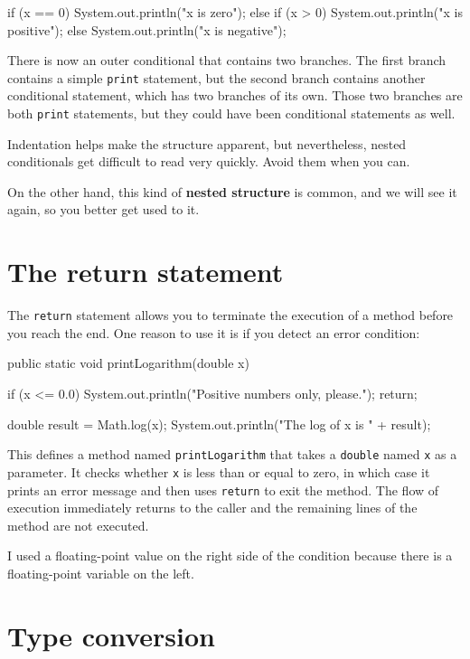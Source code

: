 \begin{code}
    if (x == 0) {
      System.out.println("x is zero");
    } else {
      if (x > 0) {
        System.out.println("x is positive");
      } else {
        System.out.println("x is negative");
      }
    }
\end{code}
%
There is now an outer conditional that contains two branches.  The
first branch contains a simple {\tt print} statement, but the second
branch contains another conditional statement, which has two branches
of its own.  Those two branches are both {\tt print}
statements, but they could have been conditional statements as
well.

Indentation helps make the structure
apparent, but nevertheless, nested conditionals get difficult to read
very quickly.  Avoid them when you can.

On the other hand, this kind of {\bf nested structure} is common, and
we will see it again, so you better get used to it.


\section{The return statement}

The {\tt return} statement allows you to terminate the execution
of a method before you reach the end.  One reason to use it
is if you detect an error condition:

\begin{code}
  public static void printLogarithm(double x) {
    if (x <= 0.0) {
      System.out.println("Positive numbers only, please.");
      return;
    }

    double result = Math.log(x);
    System.out.println("The log of x is " + result);
  }
\end{code}
%
This defines a method named {\tt printLogarithm} that takes a
{\tt  double} named {\tt x} as a parameter.  It checks whether
{\tt  x} is less than or equal to zero, in which case it prints an error
message and then uses {\tt return} to exit the method.  The flow of
execution immediately returns to the caller and the remaining lines of
the method are not executed.

I used a floating-point value on the right side of the condition
because there is a floating-point variable on the left.


\section {Type conversion}


